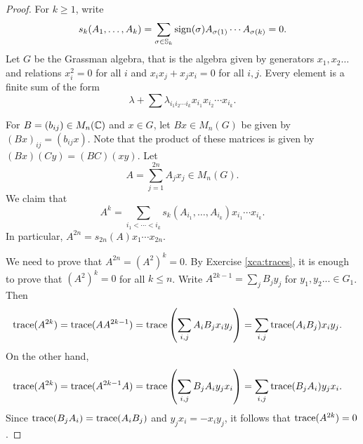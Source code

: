 \begin{proof}
    For $k\geq1$, write 
    \[
    s_k(A_1,\dots,A_k)=\sum_{\sigma\in\mathbb{S}_k}\operatorname{sign}(\sigma)A_{\sigma(1)}\cdots A_{\sigma(k)}=0.
    \]
    Let $G$ be the Grassman algebra, that is 
    the algebra given by generators $x_1,x_2\dots$ and relations 
    $x_i^2=0$ for all $i$ and 
    $x_ix_j+x_jx_i=0$ for all $i,j$. Every element is a finite sum 
    of the form
    \[
    \lambda+\sum \lambda_{i_1i_2\cdots i_k}x_{i_1}x_{i_2}\cdots x_{i_k}.
    \]
    
    For $B=(b_{ij})\in M_n(\mathbb{C})$ and $x\in G$, let $Bx\in M_n(G)$ be given by
    $(Bx)_{ij}=(b_{ij}x)$. Note that the product of these matrices is given by
    $(Bx)(Cy)=(BC)(xy)$. Let 
    \[
    A=\sum_{j=1}^{2n}A_jx_j\in M_n(G).
    \]
    We claim that 
    \[
    A^{k}=\sum_{i_1<\cdots<i_k}s_k(A_{i_1},\dots,A_{i_k})x_{i_1}\cdots x_{i_k}.
    \]
    In particular, $A^{2n}=s_{2n}(A)x_1\cdots x_{2n}$. 

    We need to prove that $A^{2n}=(A^2)^k=0$. By Exercise \ref{xca:traces}, 
    it is enough to prove that $(A^2)^k=0$ for all $k\leq n$. Write 
    $A^{2k-1}=\sum_j B_jy_j$ for $y_1,y_2...\in G_1$. Then 
    \begin{align*}
        \operatorname{trace}(A^{2k})&=\operatorname{trace}(AA^{2k-1})
        =\operatorname{trace}\left(\sum_{i,j}A_iB_jx_iy_j\right)
        =\sum_{i,j}\operatorname{trace}(A_iB_j)x_iy_j.
    \end{align*}
    On the other hand, 
    \begin{align*}
        \operatorname{trace}(A^{2k})&=\operatorname{trace}(A^{2k-1}A)
        =\operatorname{trace}\left(\sum_{i,j}B_jA_iy_jx_i\right)
        =\sum_{i,j}\operatorname{trace}(B_jA_i)y_jx_i.
    \end{align*}
    Since $\operatorname{trace}(B_jA_i)=\operatorname{trace}(A_iB_j)$ and $y_jx_i=-x_iy_j$, it follows that 
    $\operatorname{trace}(A^{2k})=0$. 
\end{proof}